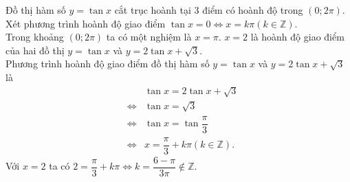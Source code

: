 \begin{ex}
{\begin{itemchoice}
\begin{center}
   \end{center}
   \itemch Đồ thị hàm số $y=\tan x$  cắt trục hoành tại 3 điểm có hoành độ trong $\left(0;2\pi \right)$.\\
   Xét phương  trình hoành độ giao điểm $\tan x=0\Leftrightarrow x=k\pi \left(k\in \mathbb{Z}\right)$.\\
   Trong khoảng $\left(0;2\pi  \right)$ ta có một nghiệm là $x=\pi$.
   \itemch $x=2$ là hoành độ  giao điểm của hai đồ thị $y=\tan x$ và $y=2\tan x+\sqrt{3}$.\\
   Phương trình hoành  độ giao điểm đồ thị hàm số $y=\tan x$ và $y=2\tan x+\sqrt{3}$ là
   \allowdisplaybreaks 
   \begin{eqnarray*}
    &&\tan x=2\tan x+\sqrt{3} \\ 
    &\Leftrightarrow& \tan x=\sqrt{3} \\ 
    &\Leftrightarrow& \tan x=\tan  \dfrac{\pi}{3}\\
    &\Leftrightarrow& x=\dfrac{\pi}{3}+k\pi \left(k\in  \mathbb{Z}\right).
   \end{eqnarray*}
   Với $x=2$ ta có $2=\dfrac{\pi}{3}+k\pi \Leftrightarrow  k=\dfrac{6-\pi}{3\pi} \notin \mathbb{Z}$.
  \end{itemchoice}
  }
\end{ex}

